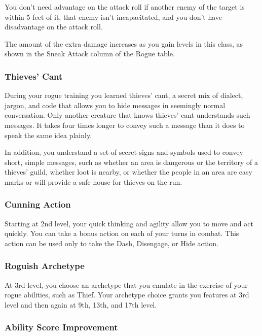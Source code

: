\documentclass[
]{article}
\begin{document}
You don't need advantage on the attack roll if another enemy of the
target is within 5 feet of it, that enemy isn't incapacitated, and you
don't have disadvantage on the attack roll.

The amount of the extra damage increases as you gain levels in this
class, as shown in the Sneak Attack column of the Rogue table.

\hypertarget{thieves-cant}{%
\subsubsection{Thieves' Cant}\label{thieves-cant}}

During your rogue training you learned thieves' cant, a secret mix of
dialect, jargon, and code that allows you to hide messages in seemingly
normal conversation. Only another creature that knows thieves' cant
understands such messages. It takes four times longer to convey such a
message than it does to speak the same idea plainly.

In addition, you understand a set of secret signs and symbols used to
convey short, simple messages, such as whether an area is dangerous or
the territory of a thieves' guild, whether loot is nearby, or whether
the people in an area are easy marks or will provide a safe house for
thieves on the run.

\hypertarget{cunning-action}{%
\subsubsection{Cunning Action}\label{cunning-action}}

Starting at 2nd level, your quick thinking and agility allow you to move
and act quickly. You can take a bonus action on each of your turns in
combat. This action can be used only to take the Dash, Disengage, or
Hide action.

\hypertarget{roguish-archetype}{%
\subsubsection{Roguish Archetype}\label{roguish-archetype}}

At 3rd level, you choose an archetype that you emulate in the exercise
of your rogue abilities, such as Thief. Your archetype choice grants you
features at 3rd level and then again at 9th, 13th, and 17th level.

\hypertarget{ability-score-improvement}{%
\subsubsection{Ability Score
Improvement}\label{ability-score-improvement}}
\end{document}
